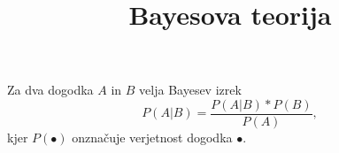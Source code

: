 \documentclass[a4paper,12pt]{article}
\begin{document}
\title{Bayesova teorija}
\maketitle  

Za dva dogodka $A$ in $B$ velja Bayesev izrek
\[P(A \lvert B) = \frac{P(A \lvert B) * P(B)}{P(A)},\]
kjer $P(\bullet)$ onznačuje verjetnost dogodka $\bullet$. 
\end{document}

